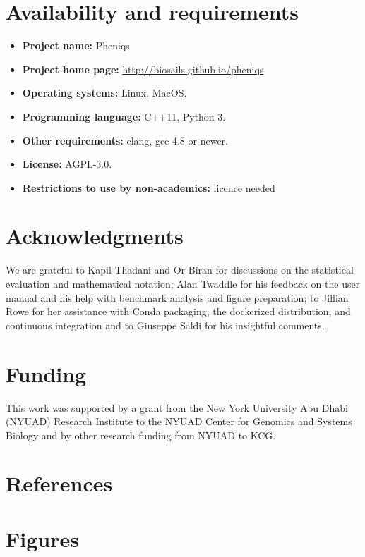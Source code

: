 \documentclass[10pt,twocolumn]{article}
\begin{document}
\section*{Availability and requirements}

\begin{itemize}
  \item \textbf{Project name:} Pheniqs
  \item \textbf{Project home page:} \url{http://biosails.github.io/pheniqs}
  \item \textbf{Operating systems:} Linux, MacOS.
  \item \textbf{Programming language:} C++11, Python 3.
  \item \textbf{Other requirements:} clang, gcc 4.8 or newer.
  \item \textbf{License:} AGPL-3.0.
  \item \textbf{Restrictions to use by non-academics:} licence needed
\end{itemize}

\section*{Acknowledgments}

We are grateful to Kapil Thadani and Or Biran for discussions on the statistical evaluation and mathematical notation; Alan Twaddle for his feedback on the user manual and his help with benchmark analysis and figure preparation; to Jillian Rowe for her assistance with Conda packaging, the dockerized distribution, and continuous integration and to Giuseppe Saldi for his insightful comments.

\section*{Funding}

This work was supported by a grant from the New York University Abu Dhabi (NYUAD) Research Institute to the NYUAD Center for Genomics and Systems Biology and by other research funding from NYUAD to KCG.

\section*{References}
\printbibliography[heading=none]

\section*{Figures}
\end{document}
